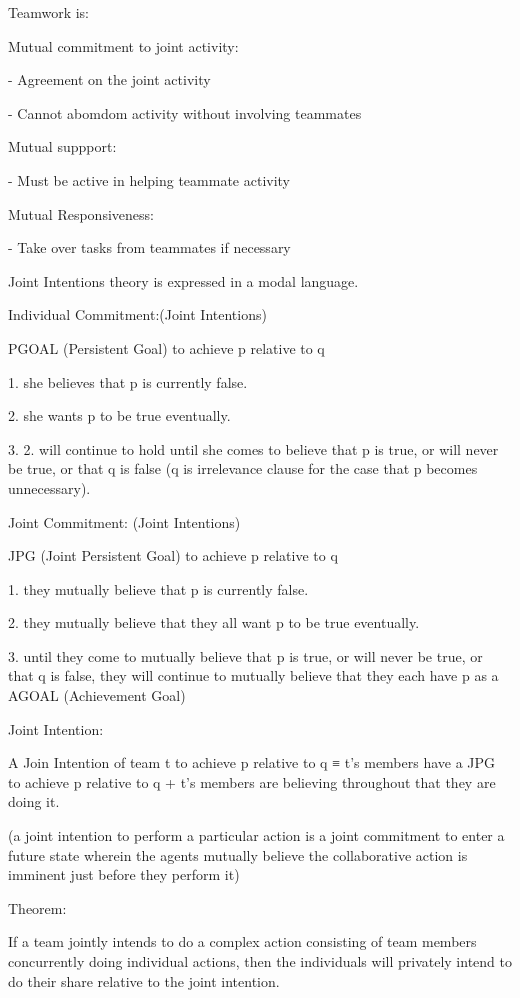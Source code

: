 \documentclass[11pt]{article}
\begin{document}
Teamwork is:

Mutual commitment to joint activity:

- Agreement on the joint activity

- Cannot abomdom activity without involving teammates

Mutual suppport:

- Must be active in helping teammate activity

Mutual Responsiveness:

- Take over tasks from teammates if necessary

Joint Intentions theory is expressed in a modal language.

Individual Commitment:(Joint Intentions)

PGOAL (Persistent Goal) to achieve p relative to q

1. she believes that p is currently false.

2. she wants p to be true eventually.

3. 2. will continue to hold until she comes to believe that p is true, or will
never be true, or that q is false (q is irrelevance clause for the case that p
becomes unnecessary).

Joint Commitment: (Joint Intentions)

JPG (Joint Persistent Goal) to achieve p relative to q

1. they mutually believe that p is currently false.

2. they mutually believe that they all want p to be true eventually.

3. until they come to mutually believe that p is true, or will never be true, or
that q is false, they will continue to mutually believe that they each have p as
a AGOAL (Achievement Goal)

Joint Intention:

A Join Intention of team t to achieve p relative to q
≡
t’s members have a JPG to achieve p relative to q 
+
t’s members are believing throughout that they are doing it.

(a joint intention to perform a particular action is a joint commitment to enter
a future state wherein the agents mutually believe the collaborative action is
imminent just before they perform it)

Theorem:

If a team jointly intends to do a complex action consisting of team members
concurrently doing individual actions, then the individuals will privately
intend to do their share relative to the joint intention.
\end{document}
